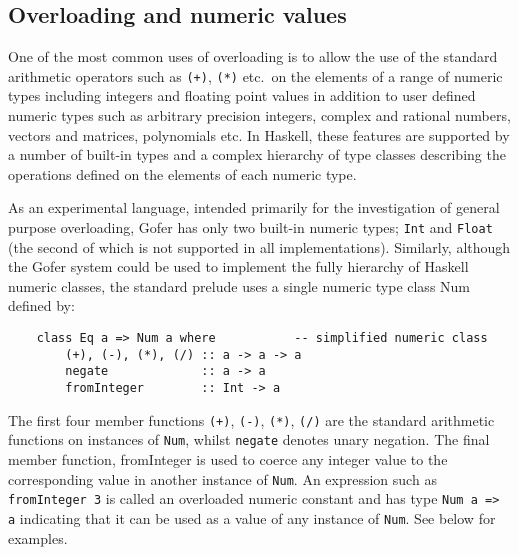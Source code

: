 \subsection{Overloading and numeric values}
One of the most common uses of overloading is to allow the use  of  the
standard arithmetic operators such as \verb"(+)", \verb"(*)" 
etc.\ on the elements  of
a range of numeric types including integers and floating point  values  in
addition to user defined numeric  types  such  as  arbitrary  precision
integers,  complex  and  rational  numbers,   vectors   and   matrices,
polynomials etc.  In Haskell, these features are supported by a  number
of built-in types and a complex hierarchy of  type  classes  describing
the operations defined on the elements of each numeric type.

As an experimental language, intended primarily for  the  investigation
of general purpose overloading, Gofer has  only  two  built-in  numeric
types; \verb"Int" and \verb"Float" 
(the second of  which  is  not  supported  in  all
implementations).  Similarly, although the Gofer system could  be  used
to implement the  fully  hierarchy  of  Haskell  numeric  classes,  the
standard prelude uses a single numeric type class Num defined by:
\begin{verbatim}
    class Eq a => Num a where           -- simplified numeric class
        (+), (-), (*), (/) :: a -> a -> a
        negate             :: a -> a
        fromInteger        :: Int -> a
\end{verbatim}
The first four member functions \verb"(+)", \verb"(-)", 
\verb"(*)",  \verb"(/)"  are  the  standard
arithmetic functions on instances of \verb"Num", whilst 
\verb"negate" denotes unary
negation.  The final member function, fromInteger is used to coerce any
integer value to the corresponding value in another  instance  of  \verb"Num".
An expression such as \verb"fromInteger 3" is called an  overloaded  numeric
constant and has type \verb"Num a => a" indicating that it can be  used  as  a
value of any instance of \verb"Num".  See below for examples.

